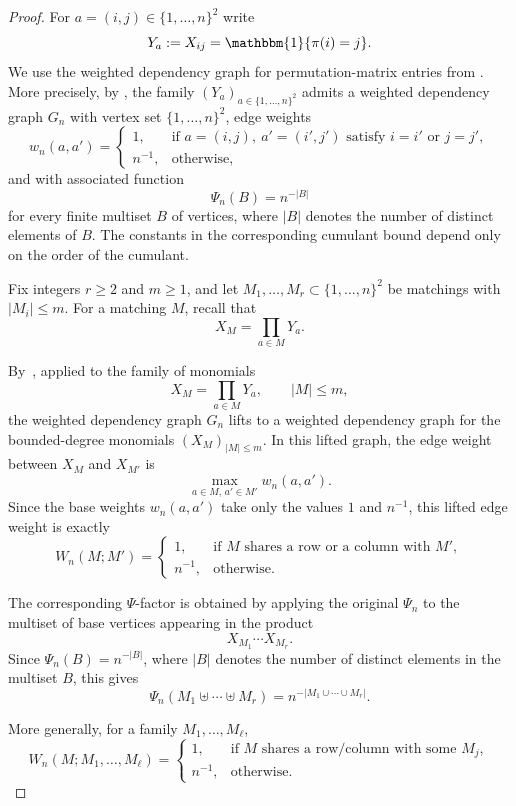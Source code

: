 \documentclass[11pt]{article}
\newcommand{\abs}[1]{| #1|}
\newcommand{\bone}{\mathbbm{1}}
\begin{document}
\begin{proof}
For $a=(i,j)\in \{1, \ldots, n\}^2$ write
\[
Y_a:=X_{ij}=\bone\{\pi(i)=j\}.
\]
We use the weighted dependency graph for permutation-matrix entries from \citet{Feray2018WeightedDG}. More precisely, by \citet[Proposition 8.1]{Feray2018WeightedDG}, the family $(Y_a)_{a\in \{1, \ldots, n\}^2}$ admits a weighted dependency graph $G_n$ with vertex set $\{1, \ldots, n\}^2$, edge weights
\[
w_n(a,a')=
\begin{cases}
1, & \text{if }a=(i,j),\ a'=(i',j')\text{ satisfy } i=i' \text{ or } j=j',\\[1mm]
n^{-1}, & \text{otherwise},
\end{cases}
\]
and with associated function
\[
\Psi_n(B)=n^{-\abs{B}}
\]
for every finite multiset $B$ of vertices, where $\abs{B}$ denotes the number of distinct elements of
$B$. The constants in the corresponding cumulant bound depend only on the order of the cumulant.

Fix integers $r\ge 2$ and $m\ge 1$, and let $M_1,\dots,M_r\subset \{1, \ldots, n\}^2$ be matchings with
$|M_i|\le m$. For a matching $M$, recall that
\[
X_M=\prod_{a\in M}Y_a.
\]


By~\citet[Proposition 5.11]{Feray2018WeightedDG}, applied to the family of monomials
\[
X_M = \prod_{a\in M}Y_a,\qquad \abs{M}\le m,
\]
the weighted dependency graph $G_n$ lifts to a weighted dependency graph for the
bounded-degree monomials $(X_M)_{\abs{M}\le m}$. In this lifted graph, the edge weight between
$X_M$ and $X_{M'}$ is
\[
\max_{a\in M,\,a'\in M'} w_n(a,a').
\]
Since the base weights $w_n(a,a')$ take only the values $1$ and $n^{-1}$, this lifted edge
weight is exactly
\[
W_n(M;M')
=
\begin{cases}
1, & \text{if } M \text{ shares a row or a column with } M',\\
n^{-1}, & \text{otherwise.}
\end{cases}
\]

The corresponding $\Psi$-factor is obtained by applying the original $\Psi_n$ to the multiset
of base vertices appearing in the product
\[
X_{M_1}\cdots X_{M_r}.
\]
Since $\Psi_n(B)=n^{-\abs{B}}$, where $\abs{B}$ denotes the
number of distinct elements in the multiset $B$, this gives
\[
\Psi_n(M_1\uplus\cdots\uplus M_r)
=
n^{-\abs{M_1\cup\cdots\cup M_r}}.
\]

More generally, for a family $M_1,\dots,M_\ell$,
\[
W_n(M;M_1,\dots,M_\ell)=
\begin{cases}
1, & \text{if }M\text{ shares a row/column with some }M_j,\\
n^{-1}, & \text{otherwise}.
\end{cases}
\]


\end{proof}
\end{document}
